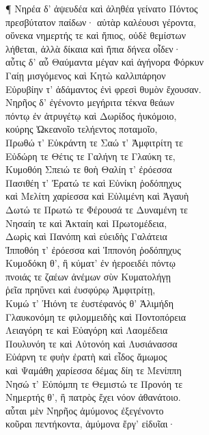 ¶ Νηρέα δ' ἀψευδέα καὶ ἀληθέα γείνατο Πόντος \\
πρεσβύτατον παίδων· αὐτὰρ καλέουσι γέροντα, \\
οὕνεκα νημερτής τε καὶ ἤπιος, οὐδὲ θεμίστων \\
λήθεται, ἀλλὰ δίκαια καὶ ἤπια δήνεα οἶδεν· \\
αὖτις δ' αὖ Θαύμαντα μέγαν καὶ ἀγήνορα Φόρκυν\\
Γαίῃ μισγόμενος καὶ Κητὼ καλλιπάρηον \\
Εὐρυβίην τ' ἀδάμαντος ἐνὶ φρεσὶ θυμὸν ἔχουσαν.\\
Νηρῆος δ' ἐγένοντο μεγήριτα τέκνα θεάων \\
πόντῳ ἐν ἀτρυγέτῳ καὶ Δωρίδος ἠυκόμοιο,\\
κούρης Ὠκεανοῖο τελήεντος ποταμοῖο, \\
Πρωθώ τ' Εὐκράντη τε Σαώ τ' Ἀμφιτρίτη τε \\
Εὐδώρη τε Θέτις τε Γαλήνη τε Γλαύκη τε,\\
Κυμοθόη Σπειώ τε θοὴ Θαλίη τ' ἐρόεσσα \\
Πασιθέη τ' Ἐρατώ τε καὶ Εὐνίκη ῥοδόπηχυς\\
καὶ Μελίτη χαρίεσσα καὶ Εὐλιμένη καὶ Ἀγαυὴ\\
Δωτώ τε Πρωτώ τε Φέρουσά τε Δυναμένη τε\\
Νησαίη τε καὶ Ἀκταίη καὶ Πρωτομέδεια,\\
Δωρὶς καὶ Πανόπη καὶ εὐειδὴς Γαλάτεια  \\
Ἱπποθόη τ' ἐρόεσσα καὶ Ἱππονόη ῥοδόπηχυς\\
Κυμοδόκη θ', ἣ κύματ' ἐν ἠεροειδέι πόντῳ\\
πνοιάς τε ζαέων ἀνέμων σὺν Κυματολήγῃ\\
ῥεῖα πρηΰνει καὶ ἐυσφύρῳ Ἀμφιτρίτῃ,\\
Κυμώ τ' Ἠιόνη τε ἐυστέφανός θ' Ἁλιμήδη \\
Γλαυκονόμη τε φιλομμειδὴς καὶ Ποντοπόρεια\\
Λειαγόρη τε καὶ Εὐαγόρη καὶ Λαομέδεια \\
Πουλυνόη τε καὶ Αὐτονόη καὶ Λυσιάνασσα\\
Εὐάρνη τε φυὴν ἐρατὴ καὶ εἶδος ἄμωμος\\
καὶ Ψαμάθη χαρίεσσα δέμας δίη τε Μενίππη \\
Νησώ τ' Εὐπόμπη τε Θεμιστώ τε Προνόη τε\\
Νημερτής θ', ἣ πατρὸς ἔχει νόον ἀθανάτοιο.\\
αὗται μὲν Νηρῆος ἀμύμονος ἐξεγένοντο\\
κοῦραι πεντήκοντα, ἀμύμονα ἔργ' εἰδυῖαι· 

